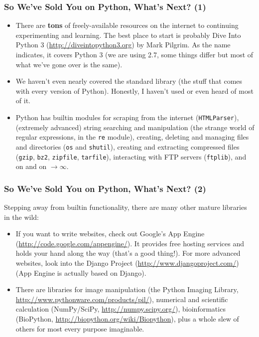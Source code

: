\documentclass[10pt]{beamer}
\begin{document}
\begin{frame}
  \frametitle{So We've Sold You on Python, What's Next? (1)}
  \begin{itemize}
    \item There are \textbf{tons} of freely-available resources on the internet to continuing experimenting and learning.
    The best place to start is probably Dive Into Python 3 (\href{http://diveintopython3.org}{http://diveintopython3.org}) by Mark Pilgrim.  As the name indicates, it covers Python 3 (we are using 2.7, some things differ but most of what we've gone over is the same).
    \item We haven't even nearly covered the standard library (the stuff that comes with every version of Python). 
      Honestly, I haven't used or even heard of most of it.
    \item Python has builtin modules for scraping from the internet (\texttt{HTMLParser}), (extremely advanced) string searching and manipulation (the strange world of regular expressions, in the \texttt{re} module), creating, deleting and managing files and directories (\texttt{os} and \texttt{shutil}), creating and extracting compressed files (\texttt{gzip}, \texttt{bz2}, \texttt{zipfile}, \texttt{tarfile}), interacting with FTP servers (\texttt{ftplib}), and on and on $\rightarrow \infty$.
  \end{itemize}
\end{frame}

\begin{frame}
  \frametitle{So We've Sold You on Python, What's Next? (2)}
  Stepping away from builtin functionality, there are many other mature libraries in the wild:
  \begin{itemize}
    \item If you want to write websites, check out Google's App Engine (\href{http://code.google.com/appengine/}{http://code.google.com/appengine/}).  It provides free hosting services and holds your hand along the way (that's a good thing!).  For more advanced websites, look into the Django Project (\href{http://www.djangoproject.com/}{http://www.djangoproject.com/}) (App Engine is actually based on Django). 
    \item There are libraries for image manipulation (the Python Imaging Library, \href{http://www.pythonware.com/products/pil}{http://www.pythonware.com/products/pil/}), numerical and scientific calculation (NumPy/SciPy, \href{http://numpy.scipy.org/}{http://numpy.scipy.org/}), bioinformatics (BioPython, \href{http://biopython.org/wiki/Biopython}{http://biopython.org/wiki/Biopython}), plus a whole slew of others for most every purpose imaginable.
  \end{itemize}
\end{frame}
\end{document}
